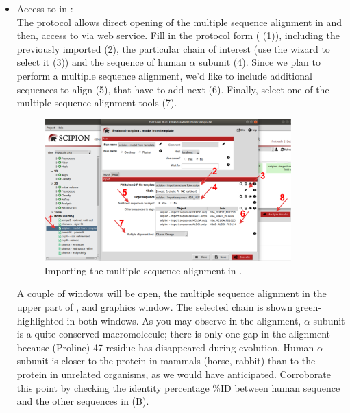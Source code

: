\begin{itemize}
 \item Access to \modeller in \chimera:\\
 The protocol  allows direct opening of the multiple sequence alignment in \chimera and then, access to \modeller via web service. Fill in the protocol form ( (1)), including the   previously imported (2), the particular chain of interest (use the wizard to select it (3)) and the  sequence of human  $\alpha$ subunit (4). Since we plan to perform a multiple sequence alignment, we'd like to include additional sequences to align (5), that have to add next (6). Finally, select one of the multiple sequence alignment tools (7). 
 
 \begin{figure}[H]
  \centering 
  \captionsetup{width=.7\linewidth} 
  \includegraphics[width=0.90\textwidth]{Images/Fig13}
  \caption{Importing the multiple sequence alignment in \chimera.}
  \label{fig:model_from_template_protocol}
  \end{figure}
 
 A couple of windows will be open, the multiple sequence alignment in the upper part of , and \chimera graphics window. The  selected chain is shown green-highlighted in both windows. As you may observe in the alignment,  $\alpha$ subunit is a quite conserved macromolecule; there is only one gap in the alignment because  (Proline) 47 residue has disappeared during evolution. Human  $\alpha$ subunit is closer to the protein in mammals (horse, rabbit) than to the protein in unrelated organisms, as we would have anticipated. Corroborate this point by checking the identity percentage \%ID  between human sequence and the other sequences in  (B). 
 

\end{itemize}
